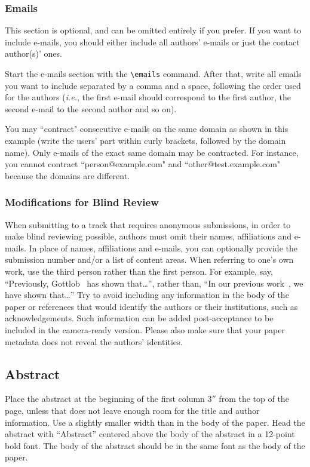 \documentclass{article}
\begin{document}
\subsubsection{Emails}

This section is optional, and can be omitted entirely if you prefer. If you want to include e-mails, you should either include all authors' e-mails or just the contact author(s)' ones.

Start the e-mails section with the {\tt \textbackslash{}emails} command. After that, write all emails you want to include separated by a comma and a space, following the order used for the authors (\emph{i.e.}, the first e-mail should correspond to the first author, the second e-mail to the second author and so on).

You may ``contract" consecutive e-mails on the same domain as shown in this example (write the users' part within curly brackets, followed by the domain name). Only e-mails of the exact same domain may be contracted. For instance, you cannot contract ``person@example.com" and ``other@test.example.com" because the domains are different.


\subsubsection{Modifications for Blind Review}
When submitting to a track that requires anonymous submissions,
in order to make blind reviewing possible, authors must omit their
names, affiliations and e-mails. In place
of names, affiliations and e-mails, you can optionally provide the submission number and/or
a list of content areas. When referring to one's own work,
use the third person rather than the
first person. For example, say, ``Previously,
Gottlob~ has shown that\ldots'', rather
than, ``In our previous work~\cite{gottlob:nonmon}, we have shown
that\ldots'' Try to avoid including any information in the body of the
paper or references that would identify the authors or their
institutions, such as acknowledgements. Such information can be added post-acceptance to be included in the camera-ready
version.
Please also make sure that your paper metadata does not reveal
the authors' identities.

\subsection{Abstract}

Place the abstract at the beginning of the first column 3$''$ from the
top of the page, unless that does not leave enough room for the title
and author information. Use a slightly smaller width than in the body
of the paper. Head the abstract with ``Abstract'' centered above the
body of the abstract in a 12-point bold font. The body of the abstract
should be in the same font as the body of the paper.
\end{document}
